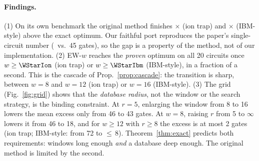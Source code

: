 \paragraph{Findings.} (1) On its own benchmark the original method finishes \GapFactorIon$\times$ (ion trap) and
\GapFactorIbm$\times$ (IBM-style) above the exact optimum. Our faithful port reproduces the paper's single-circuit number
(\FaithIon\ vs.\ 45 gates), so the gap is a property of the method, not of our implementation. (2) EW-$w$ reaches the
\emph{proven} optimum on all 20 circuits once $w\ge\WStarIon$ (ion trap) or $w\ge\WStarIbm$ (IBM-style), in a fraction of a second.
This is the cascade of Prop.~\ref{prop:cascade}: the transition is sharp, between $w=8$ and $w=12$ (ion trap) or $w=16$ (IBM-style). (3) The grid (Fig.~\ref{fig:grid})
shows that the \emph{database radius}, not the window or the search strategy, is the binding constraint. At $r=5$, enlarging the
window from 8 to 16 lowers the mean excess only from 46 to 43 gates. At $w=8$, raising $r$ from 5 to $\infty$ lowers it from 46 to 18,
and for $w\ge12$ with $r\ge8$ the excess is at most 2 gates (ion trap; IBM-style: from 72 to $\le$\,8). Theorem~\ref{thm:exact} predicts
both requirements: windows long enough \emph{and} a database deep enough. The original method is limited by the second.
